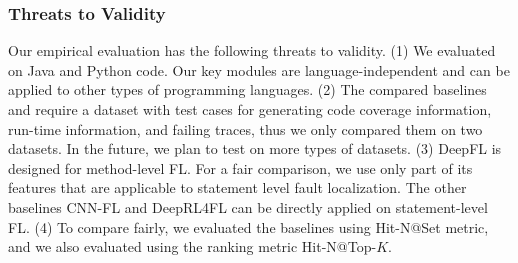 \subsubsection{Threats to Validity}
Our empirical evaluation has the following threats to validity. (1) We
evaluated {\tool} on Java and Python code. Our key modules are
language-independent and can be applied to other types of programming
languages.  (2) The compared baselines and {\tool} require a dataset
with test cases for generating code coverage information, run-time
information, and failing traces, thus we only compared them on two
datasets. In the future, we plan to test {\tool} on more types of
datasets. (3) DeepFL is designed for method-level FL. For a fair
comparison, we use only part of its features that are applicable to
statement level fault localization. The other baselines CNN-FL and
DeepRL4FL can be directly applied on statement-level FL. (4) To
compare fairly, we evaluated the baselines using Hit-N@Set
metric, and we also evaluated {\tool} using the ranking metric
Hit-N@Top-$K$.



